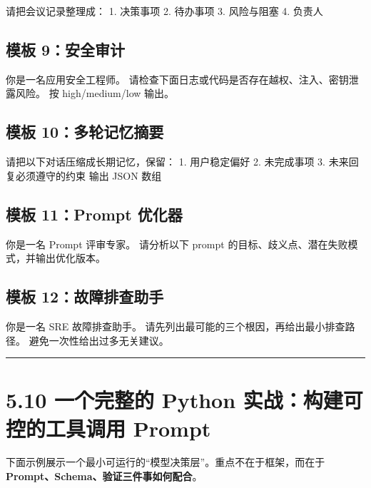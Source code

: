 \begin{codeblock}
请把会议记录整理成：
1. 决策事项
2. 待办事项
3. 风险与阻塞
4. 负责人
\end{codeblock}

\subsection{模板 9：安全审计}

\begin{codeblock}
你是一名应用安全工程师。
请检查下面日志或代码是否存在越权、注入、密钥泄露风险。
按 high/medium/low 输出。
\end{codeblock}

\subsection{模板 10：多轮记忆摘要}

\begin{codeblock}
请把以下对话压缩成长期记忆，保留：
1. 用户稳定偏好
2. 未完成事项
3. 未来回复必须遵守的约束
输出 JSON 数组
\end{codeblock}

\subsection{模板 11：Prompt 优化器}

\begin{codeblock}
你是一名 Prompt 评审专家。
请分析以下 prompt 的目标、歧义点、潜在失败模式，并输出优化版本。
\end{codeblock}

\subsection{模板 12：故障排查助手}

\begin{codeblock}
你是一名 SRE 故障排查助手。
请先列出最可能的三个根因，再给出最小排查路径。
避免一次性给出过多无关建议。
\end{codeblock}

\bigskip\hrule\bigskip

\section{5.10 一个完整的 Python 实战：构建可控的工具调用 Prompt}

下面示例展示一个最小可运行的``模型决策层''。重点不在于框架，而在于\textbf{Prompt、Schema、验证三件事如何配合}。


